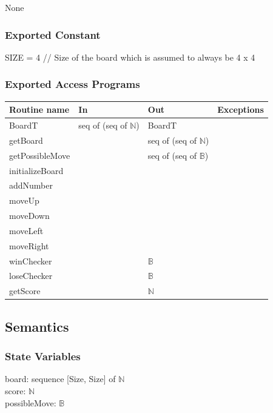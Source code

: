 \documentclass[12pt]{article}
\begin{document}
None

\subsubsection* {Exported Constant}

SIZE = 4 \quad // Size of the board which is assumed to always be 4 x 4

\subsubsection* {Exported Access Programs}

\begin{tabular}{| l | l | l | l |}
\hline
\textbf{Routine name} & \textbf{In} & \textbf{Out} & \textbf{Exceptions}\\
\hline
BoardT & seq of (seq of $\mathbb{N}$) & BoardT & \\
\hline
getBoard & ~ & seq of (seq of $\mathbb{N}$) & \\
\hline
getPossibleMove & ~ & seq of (seq of $\mathbb{B}$) & \\
\hline
initializeBoard & ~ & $ ~ $ & \\
\hline
addNumber & ~ & $ ~ $ & \\
\hline
moveUp & ~ & $ ~ $ & \\
\hline
moveDown & ~ & $ ~ $ & \\
\hline
moveLeft & ~ & $ ~ $ & \\
\hline
moveRight & ~ & $ ~ $ & \\
\hline
winChecker & ~ & $ \mathbb{B} $ & \\
\hline
loseChecker & ~ & $ \mathbb{B} $ & \\
\hline
getScore & ~ & $ \mathbb{N} $ & \\
\hline
\end{tabular}

\subsection* {Semantics}

\subsubsection* {State Variables}

board: sequence [Size, Size] of $\mathbb{N}$ \\
score: $\mathbb{N}$ \\
possibleMove: $\mathbb{B}$
\end{document}
